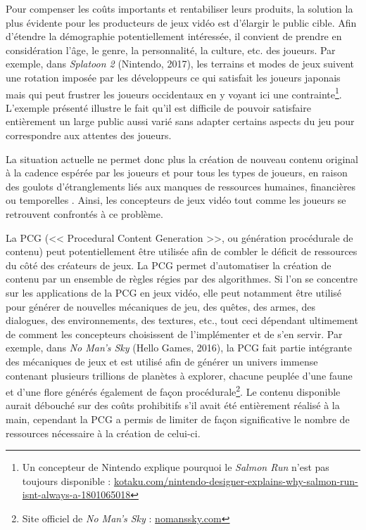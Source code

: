 \documentclass[a4paper,11pt]{article}
\begin{document}
      Pour compenser les coûts importants et rentabiliser leurs produits, la solution la plus évidente pour les producteurs de jeux vidéo est d'élargir le public cible.
      Afin d'étendre la démographie potentiellement intéressée, il convient de prendre en considération l'âge, le genre, la personnalité, la culture, etc. des joueurs.
      Par exemple, dans \textit{Splatoon 2} (Nintendo, 2017), les terrains et modes de jeux suivent une rotation imposée par les développeurs ce qui satisfait les joueurs japonais mais qui peut frustrer les joueurs occidentaux en y voyant ici une contrainte\footnote{Un concepteur de Nintendo explique pourquoi le \textit{Salmon Run} n'est pas toujours disponible : \url{kotaku.com/nintendo-designer-explains-why-salmon-run-isnt-always-a-1801065018}}. 
      L'exemple présenté illustre le fait qu'il est difficile de pouvoir satisfaire entièrement un large public aussi varié sans adapter certains aspects du jeu pour correspondre aux attentes des joueurs.
          
      La situation actuelle ne permet donc plus la création de nouveau contenu original à la cadence espérée par les joueurs et pour tous les types de joueurs, en raison des goulots d'étranglements liés aux manques de ressources humaines, financières ou temporelles \cite{Hendrikx}.
      Ainsi, les concepteurs de jeux vidéo tout comme les joueurs se retrouvent confrontés à ce problème.
      
      La PCG (<< Procedural Content Generation >>, ou génération procédurale de contenu) peut potentiellement être utilisée afin de combler le déficit de ressources du côté des créateurs de jeux.
      La PCG permet d'automatiser la création de contenu par un ensemble de règles régies par des algorithmes. 
      Si l'on se concentre sur les applications de la PCG en jeux vidéo, elle peut notamment être utilisé pour générer de nouvelles mécaniques de jeu, des quêtes, des armes, des dialogues, des environnements, des textures, etc., tout ceci dépendant ultimement de comment les concepteurs choisissent de l'implémenter et de s'en servir.
      Par exemple, dans \textit{No Man's Sky} (Hello Games, 2016), la PCG fait partie intégrante des mécaniques de jeux et est utilisé afin de générer un univers immense contenant plusieurs trillions de planètes à explorer, chacune peuplée d'une faune et d'une flore générés également de façon procédurale\footnote{Site officiel de \textit{No Man's Sky} : \url{nomanssky.com}}. 
      Le contenu disponible aurait débouché sur des coûts prohibitifs s'il avait été entièrement réalisé à la main, cependant la PCG a permis de limiter de façon significative le nombre de ressources nécessaire à la création de celui-ci.
\end{document}
